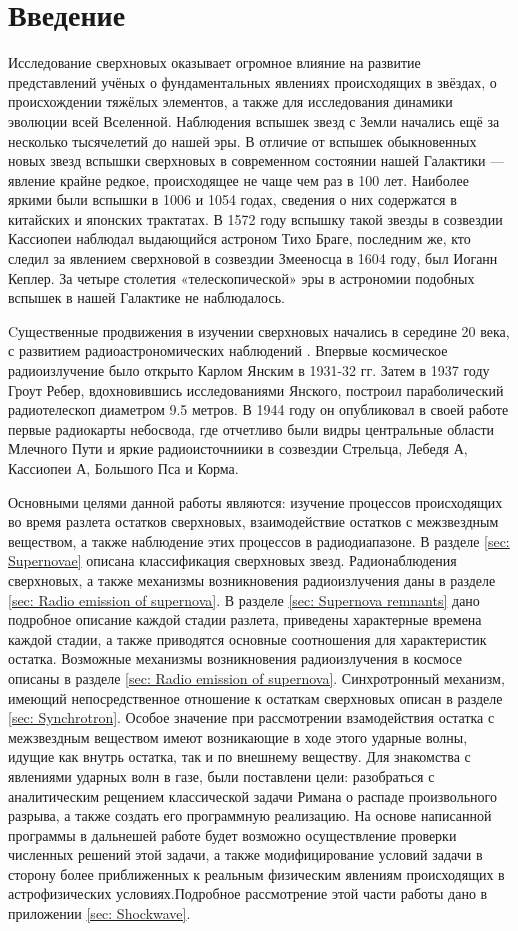 \documentclass[a4paper,12pt]{extarticle}
\begin{document}
\section{Введение}
Исследование сверхновых оказывает огромное влияние на развитие представлений учёных о фундаментальных явлениях происходящих в звёздах, о происхождении тяжёлых элементов, а также для исследования динамики эволюции всей Вселенной. 
Наблюдения вспышек звезд с Земли начались ещё за несколько тысячелетий до нашей эры.
В отличие от вспышек обыкновенных новых звезд вспышки сверхновых в современном состоянии нашей Галактики — явление крайне редкое, происходящее не чаще чем раз в 100 лет. Наиболее яркими были вспышки в 1006 и 1054 годах, сведения о них содержатся в китайских и японских трактатах. В 1572 году вспышку такой звезды в созвездии Кассиопеи наблюдал выдающийся астроном Тихо Браге, последним же, кто следил за явлением сверхновой в созвездии Змееносца в 1604 году, был Иоганн Кеплер. За четыре столетия «телескопической» эры в астрономии подобных вспышек в нашей Галактике не наблюдалось.

Cущественные продвижения в изучении сверхновых начались в середине 20 века, с развитием радиоастрономических наблюдений \cite{Kaplan1966}.  
Впервые космическое радиоизлучение было открыто Карлом Янским в 1931-32 гг. Затем в 1937 году Гроут Ребер, вдохновившись исследованиями Янского, построил параболический радиотелескоп диаметром 9.5 метров. В 1944 году он опубликовал в своей работе первые радиокарты небосвода, где отчетливо были видры центральные области Млечного Пути и яркие радиоисточниики в созвездии Стрельца, Лебедя А, Кассиопеи А, Большого Пса и Корма. 

Основными целями данной работы являются: изучение процессов происходящих во время разлета остатков сверхновых, взаимодействие остатков с межзвездным веществом, а также наблюдение этих процессов в радиодиапазоне. В разделе \ref{sec: Supernovae} описана классификация сверхновых звезд. Радионаблюдения сверхновых, а также механизмы возникновения радиоизлучения даны в разделе \ref{sec: Radio emission of supernova}. В разделе \ref{sec: Supernova remnants} дано подробное описание каждой стадии разлета, приведены характерные времена каждой стадии, а также приводятся основные соотношения для характеристик остатка. Возможные механизмы возникновения радиоизлучения в космосе описаны в разделе \ref{sec: Radio emission of supernova}. Синхротронный механизм, имеющий непосредственное отношение к остаткам сверхновых описан в разделе \ref{sec: Synchrotron}.
Особое значение при рассмотрении взамодействия остатка с межзвездным веществом имеют возникающие в ходе этого ударные волны, идущие как внутрь остатка, так и по внешнему веществу. 
Для знакомства с явлениями ударных волн в газе, были поставлени цели: разобраться с аналитическим рещением классической задачи Римана о распаде произвольного разрыва, а также создать его программную реализацию. На основе написанной программы в дальнешей работе будет возможно осуществление проверки численных решений этой задачи, а также модифицирование условий задачи в сторону более приближенных к реальным физическим явлениям происходящих в астрофизических условиях.Подробное рассмотрение этой части работы дано в приложении \ref{sec: Shockwave}. 
\end{document}
